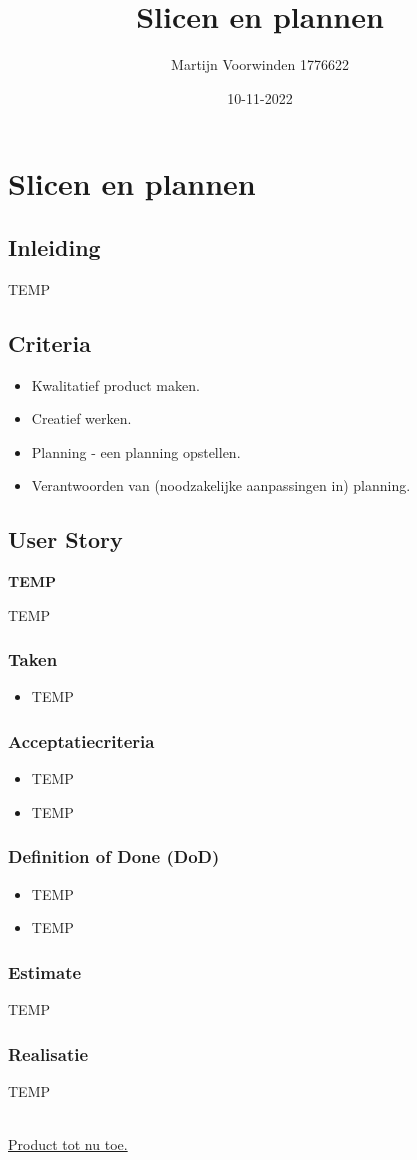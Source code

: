 \documentclass{article}
\title{Slicen en plannen}
\author{Martijn Voorwinden 1776622}
\date{10-11-2022}
\newcommand{\us}[8]{
    \maketitle
    \section*{Slicen en plannen}
    \subsection*{Inleiding}
    #1
    \subsection*{Criteria}
    \begin{itemize}
        \item Kwalitatief product maken.
        \item Creatief werken.
        \item Planning - een planning opstellen.
        \item Verantwoorden van (noodzakelijke aanpassingen in) planning.
    \end{itemize}
    \subsection*{User Story}
    \textbf{#2}
    #3
    \subsubsection*{Taken}
    #4
    \subsubsection*{Acceptatiecriteria}
    #5
    \subsubsection*{Definition of Done (DoD)}
    #6
    \subsubsection*{Estimate}
    #7
    \subsubsection*{Realisatie}
    #8
    \\ \newline \href{https://github.com/MartijnCBV/INNO/tree/master}{Product tot nu toe.}
}
\begin{document}
    \us
    {
        TEMP
    }
    {
        TEMP
    }
    {
        TEMP
    }
    {
        \begin{itemize}
            \item TEMP
        \end{itemize}
    }
    {
        \begin{itemize}
            \item TEMP
            \item TEMP
        \end{itemize}
    }
    {
        \begin{itemize}
            \item TEMP
            \item TEMP
        \end{itemize}
    }
    {
        TEMP
    }
    {
        TEMP
    }
\end{document}
